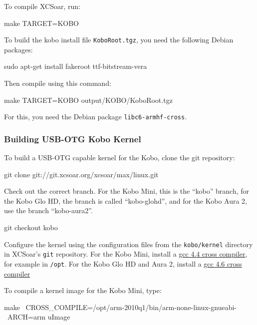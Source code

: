 To compile XCSoar, run:

\begin{verbatim*}
make TARGET=KOBO
\end{verbatim*}

To build the kobo install file \texttt{KoboRoot.tgz}, you need the
following Debian packages:

\begin{verbatim*}
sudo apt-get install fakeroot ttf-bitstream-vera
\end{verbatim*}

Then compile using this command:

\begin{verbatim*}
make TARGET=KOBO output/KOBO/KoboRoot.tgz
\end{verbatim*}

For this, you need the Debian package \verb|libc6-armhf-cross|.

\subsubsection{Building USB-OTG Kobo Kernel}

To build a USB-OTG capable kernel for the Kobo, clone the git
repository:

\begin{verbatim*}
git clone git://git.xcsoar.org/xcsoar/max/linux.git
\end{verbatim*}

Check out the correct branch. For the Kobo Mini, this is the ``kobo'' branch,
for the Kobo Glo HD, the branch is called ``kobo-glohd'', and for the Kobo Aura 2,
use the branch ``kobo-aura2''.

\begin{verbatim*}
git checkout kobo
\end{verbatim*}

Configure the kernel using the configuration files from the \texttt{kobo/kernel}
directory in XCSoar's \texttt{git} repository. For the Kobo Mini, install a
\href{http://openlinux.amlogic.com:8000/download/ARM/gnutools/arm-2010q1-202-arm-none-linux-gnueabi-i686-pc-linux-gnu.tar.bz2}{gcc
  4.4 cross compiler}, for example in \texttt{/opt}. For the Kobo Glo HD and
Aura 2, install a
\href{https://launchpad.net/gcc-arm-embedded/4.6/4.6-2012-q4-update/+download/gcc-arm-none-eabi-4_6-2012q4-20121016.tar.bz2}{gcc
  4.6 cross compiler}

To compile a kernel image for the Kobo Mini, type:

\begin{verbatim*}
make \
  CROSS_COMPILE=/opt/arm-2010q1/bin/arm-none-linux-gnueabi- \
  ARCH=arm uImage
\end{verbatim*}

